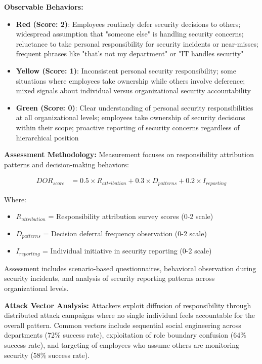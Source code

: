 \documentclass[11pt,a4paper]{article}
\begin{document}
\textbf{Observable Behaviors:}
\begin{itemize}
\item \textbf{Red (Score: 2)}: Employees routinely defer security decisions to others; widespread assumption that "someone else" is handling security concerns; reluctance to take personal responsibility for security incidents or near-misses; frequent phrases like "that's not my department" or "IT handles security"
\item \textbf{Yellow (Score: 1)}: Inconsistent personal security responsibility; some situations where employees take ownership while others involve deference; mixed signals about individual versus organizational security accountability
\item \textbf{Green (Score: 0)}: Clear understanding of personal security responsibilities at all organizational levels; employees take ownership of security decisions within their scope; proactive reporting of security concerns regardless of hierarchical position
\end{itemize}

\textbf{Assessment Methodology:}
Measurement focuses on responsibility attribution patterns and decision-making behaviors:

\begin{align}
DOR_{score} &= 0.5 \times R_{attribution} + 0.3 \times D_{patterns} + 0.2 \times I_{reporting}
\end{align}

Where:
\begin{itemize}
\item $R_{attribution}$ = Responsibility attribution survey scores (0-2 scale)
\item $D_{patterns}$ = Decision deferral frequency observation (0-2 scale)
\item $I_{reporting}$ = Individual initiative in security reporting (0-2 scale)
\end{itemize}

Assessment includes scenario-based questionnaires, behavioral observation during security incidents, and analysis of security reporting patterns across organizational levels.

\textbf{Attack Vector Analysis:}
Attackers exploit diffusion of responsibility through distributed attack campaigns where no single individual feels accountable for the overall pattern. Common vectors include sequential social engineering across departments (72\% success rate), exploitation of role boundary confusion (64\% success rate), and targeting of employees who assume others are monitoring security (58\% success rate).
\end{document}
